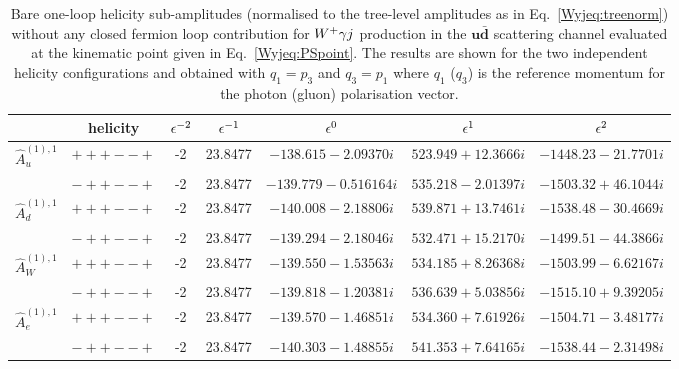 \documentclass[main.tex]{subfiles}
\begin{document}
\begin{table}[t!]
\centering
\begin{tabularx}{1.0\textwidth}{|C{0.7}|C{1.0}|C{0.6}|C{1.0}|C{1.2}|C{1.2}|C{1.3}|}
\hline
      & helicity & $\epsilon^{-2}$ & $\epsilon^{-1}$ & $\epsilon^{0}$ & $\epsilon^{1}$ & $\epsilon^{2}$ \\
\hline
$\hat A^{(1),1}_u$ & $\scriptstyle +++--+$ & -2 & 23.8477 & $-138.615 - 2.09370  i$ & $523.949 + 12.3666 i$ & $-1448.23 - 21.7701 i$ \\
                   & $\scriptstyle -++--+$ & -2 & 23.8477 & $-139.779 - 0.516164 i$ & $535.218 - 2.01397 i$ & $-1503.32 + 46.1044 i$ \\
\hline
$\hat A^{(1),1}_d$ & $\scriptstyle +++--+$ & -2 & 23.8477 & $-140.008 - 2.18806 i$  & $539.871 + 13.7461 i$ & $-1538.48 - 30.4669 i$ \\
                   & $\scriptstyle -++--+$ & -2 & 23.8477 & $-139.294 - 2.18046 i$  & $532.471 + 15.2170 i$ & $-1499.51 - 44.3866 i$ \\
\hline
$\hat A^{(1),1}_W$ & $\scriptstyle +++--+$ & -2 & 23.8477 & $-139.550 - 1.53563 i$  & $534.185 + 8.26368 i$ & $-1503.99 - 6.62167 i$ \\
                   & $\scriptstyle -++--+$ & -2 & 23.8477 & $-139.818 - 1.20381 i$  & $536.639 + 5.03856 i$ & $-1515.10 + 9.39205 i$ \\
\hline
$\hat A^{(1),1}_e$ & $\scriptstyle +++--+$ & -2 & 23.8477 & $-139.570 - 1.46851 i$  & $534.360 + 7.61926 i$ & $-1504.71 - 3.48177 i$ \\
                   & $\scriptstyle -++--+$ & -2 & 23.8477 & $-140.303 - 1.48855 i$  & $541.353 + 7.64165 i$ & $-1538.44 - 2.31498 i$ \\
\hline
\end{tabularx}
\caption{\label{Wyjtab:benchmark1Lnf0bare} 
Bare one-loop helicity sub-amplitudes (normalised to the tree-level amplitudes as in Eq.~\ref{Wyjeq:treenorm}) without any closed fermion loop contribution  
for $W^+\gamma j$ production in the $\mathbf{u\bar{d}}$ scattering channel 
evaluated at the kinematic point given in Eq.~\ref{Wyjeq:PSpoint}. The results are shown for the two independent helicity configurations and obtained with $q_1 = p_3$ and $q_3 = p_1$ where $q_1$ ($q_3$) is the 
reference momentum for the photon (gluon) polarisation vector.
}
\end{table}
\end{document}

